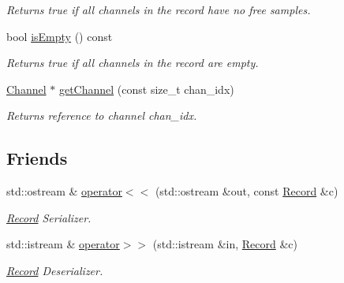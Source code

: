 \begin{DoxyCompactItemize}
\begin{DoxyCompactList}\small\item\em Returns true if all channels in the record have no free samples. \item\end{DoxyCompactList}\item 
\hypertarget{classgdf_1_1_record_ab75b4fa725bcdfddd08c4b3371ed48bd}{
bool \hyperlink{classgdf_1_1_record_ab75b4fa725bcdfddd08c4b3371ed48bd}{isEmpty} () const }
\label{classgdf_1_1_record_ab75b4fa725bcdfddd08c4b3371ed48bd}

\begin{DoxyCompactList}\small\item\em Returns true if all channels in the record are empty. \item\end{DoxyCompactList}\item 
\hypertarget{classgdf_1_1_record_a0d3b34f0085e5b1291ce0716f0f15f7d}{
\hyperlink{classgdf_1_1_channel}{Channel} $\ast$ \hyperlink{classgdf_1_1_record_a0d3b34f0085e5b1291ce0716f0f15f7d}{getChannel} (const size\_\-t chan\_\-idx)}
\label{classgdf_1_1_record_a0d3b34f0085e5b1291ce0716f0f15f7d}

\begin{DoxyCompactList}\small\item\em Returns reference to channel chan\_\-idx. \item\end{DoxyCompactList}\end{DoxyCompactItemize}
\subsection*{Friends}
\begin{DoxyCompactItemize}
\item 
\hypertarget{classgdf_1_1_record_abb5ecbb642f6c8c5fc28578757397e5f}{
std::ostream \& \hyperlink{classgdf_1_1_record_abb5ecbb642f6c8c5fc28578757397e5f}{operator$<$$<$} (std::ostream \&out, const \hyperlink{classgdf_1_1_record}{Record} \&c)}
\label{classgdf_1_1_record_abb5ecbb642f6c8c5fc28578757397e5f}

\begin{DoxyCompactList}\small\item\em \hyperlink{classgdf_1_1_record}{Record} Serializer. \item\end{DoxyCompactList}\item 
\hypertarget{classgdf_1_1_record_a8fe36dc766ee2beec048171871cf879e}{
std::istream \& \hyperlink{classgdf_1_1_record_a8fe36dc766ee2beec048171871cf879e}{operator$>$$>$} (std::istream \&in, \hyperlink{classgdf_1_1_record}{Record} \&c)}
\label{classgdf_1_1_record_a8fe36dc766ee2beec048171871cf879e}

\begin{DoxyCompactList}\small\item\em \hyperlink{classgdf_1_1_record}{Record} Deserializer. \item\end{DoxyCompactList}\end{DoxyCompactItemize}


